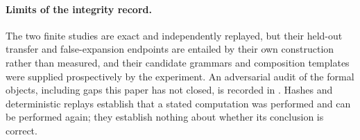 \paragraph{Limits of the integrity record.}
The two finite studies are exact and independently replayed, but their
held-out transfer and false-expansion endpoints are entailed by their own
construction rather than measured, and their candidate grammars and
composition templates were supplied prospectively by the experiment. An
adversarial audit of the formal objects, including gaps this paper has not
closed, is recorded in
.
Hashes and deterministic replays establish that a stated computation was
performed and can be performed again; they establish nothing about whether
its conclusion is correct.
